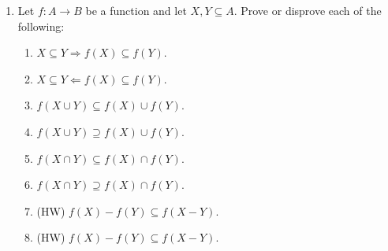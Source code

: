 \documentclass[12pt, reqno]{amsart}
\begin{document}
\begin{enumerate}
\item   Let $f\colon A \to B$ be a function and let $X,Y \subseteq A$. Prove
  or disprove each of the following:
  \begin{enumerate}
  \item $X \subseteq Y \Rightarrow f(X) \subseteq f(Y)$.
  \item $X \subseteq Y \Leftarrow f(X) \subseteq f(Y)$.
  \item $f(X \cup Y) \subseteq f(X) \cup f(Y)$.
  \item $f(X \cup Y) \supseteq f(X) \cup f(Y)$.
  \item $f(X \cap Y) \subseteq f(X) \cap f(Y)$.
  \item $f(X \cap Y) \supseteq f(X) \cap f(Y)$.
  \item (HW) $f(X) - f(Y) \subseteq f(X - Y)$.
  \item (HW) $f(X) - f(Y) \subseteq f(X - Y)$.
\end{enumerate}  

  \end{enumerate}
\end{document}

